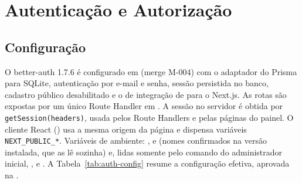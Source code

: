 
\section{Autenticação e Autorização}\label{sec:arq-auth}

\subsection{Configuração}

O better-auth 1.7.6 é configurado em  (merge M-004) com o adaptador do Prisma para SQLite, autenticação por e-mail e senha, sessão persistida no banco, cadastro público desabilitado e o  de integração de  para o Next.js. As rotas são expostas por um único Route Handler em . A sessão no servidor é obtida por \texttt{getSession(headers)}, usada pelos Route Handlers e pelas páginas do painel. O cliente React () usa a mesma origem da página e dispensa variáveis \texttt{NEXT\_PUBLIC\_*}. Variáveis de ambiente: ,  e  (nomes confirmados na versão instalada, que as lê sozinha) e, lidas somente pelo comando do administrador inicial, ,  e . A Tabela~\ref{tab:auth-config} resume a configuração efetiva, aprovada na .

